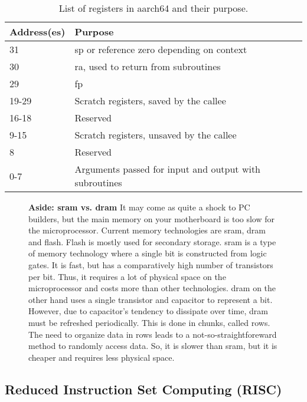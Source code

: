 \documentclass[letterpaper, 12pt]{book}
\newcommand*{\myaside}[2]{\noindent
    \colorbox{red!10}{\noindent
        \begin{minipage}{\textwidth}
            \textbf{Aside: #1} 
            #2
        \end{minipage}
    }
}
\begin{document}
\begin{table}[t]\centering
    \caption{List of \glspl{register} in \gls{aarch64} and their purpose.\label{tab:registers}}
    \begin{tabular}{|l|l|}
        \hline Address(es) & Purpose \\\hline\hline
        31 & \Gls{sp} or \gls{reference zero} depending on context \\\hline
        30 & \Gls{ra}, used to return from subroutines \\\hline
        29 & \Gls{fp}\\\hline
        19-29 & Scratch registers, saved by the \gls{callee}\\\hline
        16-18 & Reserved\\\hline
        9-15 & Scratch registers, unsaved by the \gls{callee}\\\hline
        8 & Reserved\\\hline
        0-7 & Arguments passed for input and output with subroutines\\\hline
    \end{tabular}
\end{table}

\begin{figure}[b]
    \myaside{\gls{sram} vs. \gls{dram}}{%
    It may come as quite a shock to PC builders, but the main memory on your motherboard is too slow for the 
    microprocessor. Current memory technologies are \gls{sram}, \gls{dram} and flash. Flash is mostly used 
    for secondary storage. \gls{sram} is a type of memory technology where a single bit is constructed from 
    logic gates. It is fast, but has a comparatively high number of transistors per bit. Thus, it requires 
    a lot of physical space on the microprocessor and costs more than other technologies. \gls{dram} on the 
    other hand uses a single transistor and capacitor to represent a bit. However, due to capacitor's tendency
    to dissipate over time, \gls{dram} must be refreshed periodically. This is done in chunks, called rows. 
    The need to organize data in rows leads to a not-so-straightforeward method to randomly access data. So, 
    it is slower than \gls{sram}, but it is cheaper and requires less physical space.}
\end{figure}


\subsection{Reduced Instruction Set Computing (RISC)\label{sec:alu:risc}}
\end{document}
